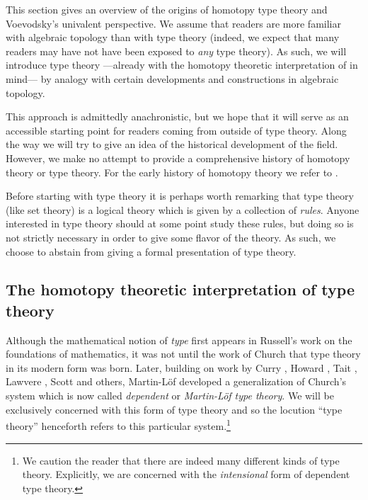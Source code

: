 \documentclass{amsart}
\theoremstyle{definition}
\theoremstyle{remark}
\numberwithin{equation}{section}
\begin{document}
This section gives an overview of the origins of homotopy type
theory and Voevodsky's univalent perspective.  We assume that
readers are more familiar with algebraic topology than with type
theory (indeed, we expect that many readers may have not have been
exposed to \emph{any} type theory).  As such, we will introduce type
theory ---already with the homotopy theoretic interpretation of \cite{Awodey:2009bz,Voevodsky:2009} in mind--- by analogy with certain developments and constructions
in algebraic topology.  

This approach is admittedly anachronistic, but
we hope that it will serve as an accessible starting point for readers
coming from outside of type theory.  Along the way we will try to give
an idea of the historical development of the field.  However, we make
no attempt to provide a comprehensive history of homotopy theory or type theory.
For the early history of homotopy theory we refer to
\cite{Dieudonne:2009dv}.

Before starting with type theory it is perhaps worth remarking that
type theory (like set theory) is a logical theory which is given by a
collection of \emph{rules}.  Anyone interested in type theory
should at some point study these rules, but doing so is not
strictly necessary in order to give some flavor of the theory.  As
such, we choose to abstain from giving a formal presentation of type
theory.

\subsection{The homotopy theoretic interpretation of type theory}\label{sec:homotopy_interp}

Although the mathematical notion of \emph{type} first appears in
Russell's \cite{Russell:1903wn} work on the
foundations of mathematics, it was not until the work of Church
\cite{Church:1940tu} that type theory in its modern form was born.
Later, building on work by Curry \cite{Curry:1934vy}, Howard \cite{Howard:FTNC}, Tait
\cite{Tait}, Lawvere \cite{Lawvere:2006tl},
Scott \cite{Scott:1970vu} and others, Martin-L\"{o}f
\cite{MartinLof:1998tw,MartinLof:1975tb,MartinLof:1982bn,MartinLof:1984tr}
developed a generalization of Church's system which is now called
\emph{dependent} or \emph{Martin-L\"{o}f type theory}. We will be
exclusively concerned with this form of type theory and so the
locution ``type theory'' henceforth refers to this particular
system.\footnote{We caution the reader that there are indeed many
  different kinds of type theory.  Explicitly, we are concerned with
  the \emph{intensional} form of dependent type theory.}
\end{document}
